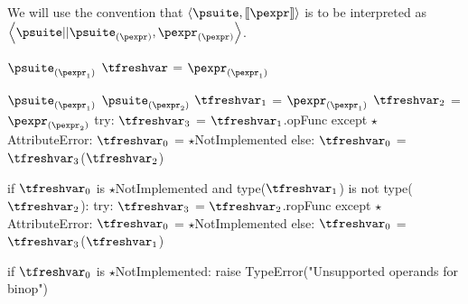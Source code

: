 \documentclass{article}
\begin{document}
We will use the convention that $\left<\psuite, \meaningof{\pexpr}\right>$ is to be interpreted as
$\left<\psuite || \psuite_{(\pexpr)}, \pexpr_{(\pexpr)}\right>$.

\newsavebox{\andBox}
\begin{lrbox}{\andBox}
\begin{python}
$\psuite_{(\pexpr_1)}$
$\tfreshvar$ = $\pexpr_{(\pexpr_1)}$
\end{python}
\end{lrbox}

\begin{mathpar}
\end{mathpar}

\begin{mathpar}
\end{mathpar}

\newsavebox{\binopBox}
\begin{lrbox}{\binopBox}
\begin{python}
$\psuite_{(\pexpr_1)}$
$\psuite_{(\pexpr_2)}$
$\tfreshvar_1$ = $\pexpr_{(\pexpr_1)}$
$\tfreshvar_2$ = $\pexpr_{(\pexpr_2)}$
try:
  $\tfreshvar_3$ = $\tfreshvar_1$.opFunc
except $\star$AttributeError:
  $\tfreshvar_0$ = $\star$NotImplemented
else:
  $\tfreshvar_0$ = $\tfreshvar_3$($\tfreshvar_2$)

if $\tfreshvar_0$ is $\star$NotImplemented and
   type($\tfreshvar_1$) is not type($\tfreshvar_2$):
  try:
    $\tfreshvar_3$ = $\tfreshvar_2$.ropFunc
  except $\star$AttributeError:
    $\tfreshvar_0$ = $\star$NotImplemented
  else:
    $\tfreshvar_0$ = $\tfreshvar_3$($\tfreshvar_1$)

if $\tfreshvar_0$ is $\star$NotImplemented:
  raise TypeError("Unsupported operands for binop")

\end{python}
\end{lrbox}

\begin{mathpar}
\end{mathpar}
\end{document}
